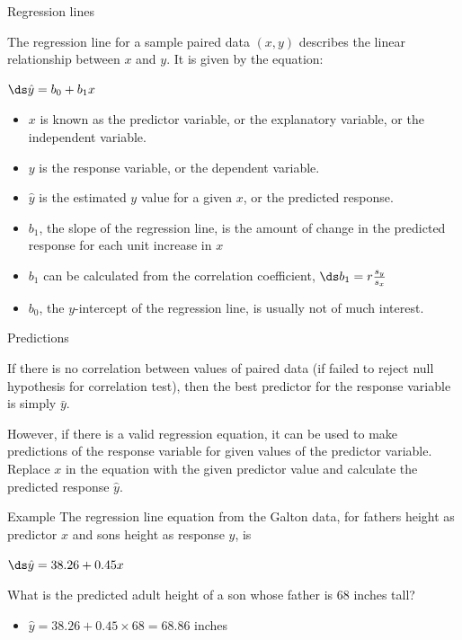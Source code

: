 \documentclass[xcolor=table]{beamer}
\begin{document}
\begin{frame}{Regression lines}
\begin{block}{}
The regression line for a sample paired data $(x,y)$ describes the linear relationship between $x$ and $y$. It is given by the equation:\\
\medskip
{\centering \Large
$\ds \hat y = b_0 + b_1 x$
\par}
\medskip
\begin{itemize}
\pause\item $x$ is known as the predictor variable, or the explanatory variable, or the independent variable.
\pause\item $y$ is the response variable, or the dependent variable.
\pause\item $\hat y$ is the estimated $y$ value for a given $x$, or the predicted response.
\pause\item $b_1$, the slope of the regression line, is the amount of change in the predicted response for each unit increase in $x$
\pause\item $b_1$ can be calculated from the correlation coefficient, $\ds b_1 = r \frac{s_y}{s_x}$
\pause\item $b_0$, the $y$-intercept of the regression line, is usually not of much interest.
\end{itemize}
\end{block}
\end{frame}

\begin{frame}{Predictions}
\begin{block}{}
If there is no correlation between values of paired data (if failed to reject null hypothesis for correlation test), then the best predictor for the response variable is simply $\bar y$.
\end{block}

\pause
\begin{block}{}
\large
However, if there is a valid regression equation, it can be used to make predictions of the response variable for given values of the predictor variable. Replace $x$ in the equation with the given predictor value and calculate the predicted response $\hat y$.
\end{block}

\pause
\begin{exampleblock}{Example}
The regression line equation from the Galton data, for fathers height as predictor $x$ and sons height as response $y$, is \\
\smallskip
{\centering
$\ds \hat y = 38.26 + 0.45 x$
\par}
\smallskip
What is the predicted adult height of a son whose father is 68 inches tall?
\begin{itemize}
\pause\item $\hat y = 38.26 + 0.45 \times 68 = 68.86$ inches
\end{itemize}
\end{exampleblock}
\end{frame}
\end{document}
